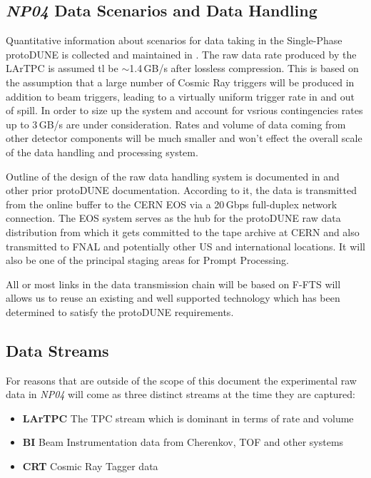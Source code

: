 \documentclass[pdftex,12pt,letter]{article}
\newcommand{\pd}{protoDUNE\xspace}
\newcommand{\expname}{\textit{NP04}\xspace}
\newcommand{\PP}{Prompt Processing\xspace}
\begin{document}
\subsection{\expname Data Scenarios and Data Handling}
\label{sec:rawdata}
Quantitative information about scenarios for data taking in the Single-Phase \pd is collected and maintained in \cite{docdb1086}.
The raw data rate produced by the LArTPC is assumed tl be $\sim$1.4\,GB/s after lossless compression. This is based on
the assumption that a large number of Cosmic Ray triggers will be produced in addition to beam triggers, leading
to a virtually uniform trigger rate in and out of spill. In order to size up
the system and account for vsrious contingencies rates up to 3\,GB/s are under consideration.
Rates and volume of data coming from other detector components will be much smaller
and won't effect the overall scale of the data handling and processing system.

Outline of the design of the raw data handling system is documented in  \cite{docdb1212} and other
prior \pd documentation. According to it, the data is transmitted from the online buffer to the
CERN EOS \cite{eos} via a 20\,Gbps full-duplex network connection.
The EOS system serves as the hub for the \pd raw data distribution from which
it gets committed to the tape archive at CERN and also transmitted to FNAL and potentially
other US and international locations.  It will also be one of the principal staging areas for \PP. 

All or most links in the data transmission chain will be based on F-FTS \cite{fts} will allows us
to reuse an existing and well supported technology which has been determined to satisfy
the \pd requirements.

\subsection{Data Streams}
\label{sec:streams}

For reasons that are outside of the scope of this document  the experimental raw data in \expname
will come as three distinct streams at the time they are captured:
\begin{itemize}
\item \textbf{LArTPC} The TPC  stream which is dominant in terms of rate and volume
\item \textbf{BI} Beam Instrumentation data from Cherenkov, TOF and other systems
\item \textbf{CRT} Cosmic Ray Tagger data
\end{itemize}
\end{document}
